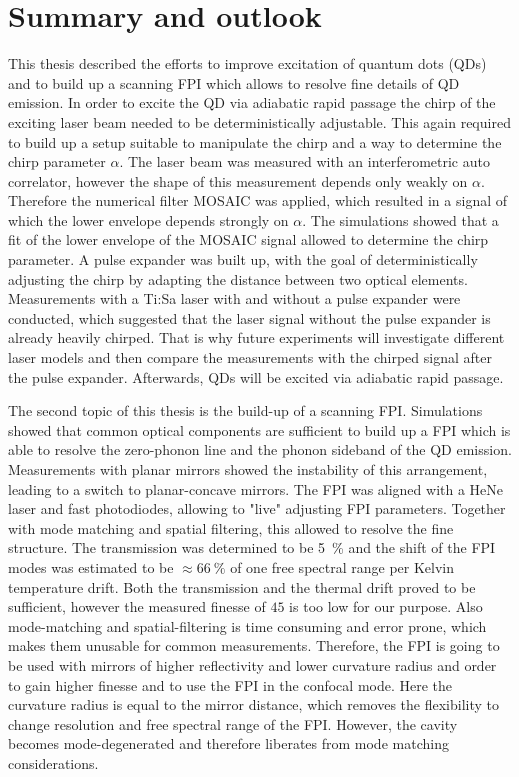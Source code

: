 \chapter{Summary and outlook}

This thesis described the efforts to improve excitation of quantum dots (\ac{QD}s) and to build up a scanning \acl{FPI} which allows to resolve fine details of \ac{QD} emission.
In order to excite the \ac{QD} via adiabatic rapid passage the chirp of the exciting laser beam needed to be deterministically adjustable.
This again required to build up a setup suitable to manipulate the chirp and a way to determine the chirp parameter $\alpha$.
The laser beam was measured with an interferometric auto correlator, however the shape of this measurement depends only weakly on $\alpha$.
Therefore the numerical filter \ac{MOSAIC} was applied, which resulted in a signal of which the lower envelope depends strongly on $\alpha$.
The simulations showed that a fit of the lower envelope of the \ac{MOSAIC} signal allowed to determine the chirp parameter.
A pulse expander was built up, with the goal of deterministically adjusting the chirp by adapting the distance between two optical elements.
Measurements with a Ti:Sa laser with and without a pulse expander were conducted, which suggested that the laser signal without the pulse expander is already heavily chirped.
That is why future experiments will investigate different laser models and then compare the measurements with the chirped signal after the pulse expander.
Afterwards, \acp{QD} will be excited via adiabatic rapid passage.

The second topic of this thesis is the build-up of a scanning \ac{FPI}.
Simulations showed that common optical components are sufficient to build up a \ac{FPI} which is able to resolve the zero-phonon line and the phonon sideband of the \ac{QD} emission.
Measurements with planar mirrors showed the instability of this arrangement, leading to a switch to planar-concave mirrors.
The \ac{FPI} was aligned with a HeNe laser and fast photodiodes, allowing to "live" adjusting \ac{FPI} parameters.
Together with mode matching and spatial filtering, this allowed to resolve the fine structure.
The transmission was determined to be \SI{5}{\percent} and the shift of the \ac{FPI} modes was estimated to be $\approx \SI{66}{\percent}$ of one free spectral range per Kelvin temperature drift.
Both the transmission and the thermal drift proved to be sufficient, however the measured finesse of $45$ is too low for our purpose.
Also mode-matching and spatial-filtering is time consuming and error prone, which makes them unusable for common measurements.
Therefore, the \ac{FPI} is going to be used with mirrors of higher reflectivity and lower curvature radius and order to gain higher finesse and to use the \ac{FPI} in the confocal mode.
Here the curvature radius is equal to the mirror distance, which removes the flexibility to change resolution and free spectral range of the \ac{FPI}.
However, the cavity becomes mode-degenerated and therefore liberates from mode matching considerations.